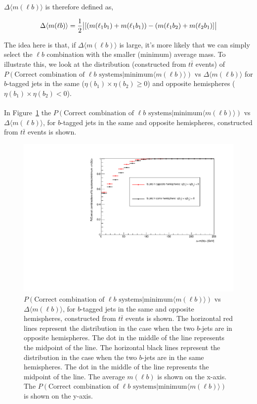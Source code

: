 $\Delta \langle m(\ell b) \rangle$ is therefore defined as,

\begin{equation}
    \Delta \langle m(\ell b) \rangle = \frac{1}{2} \abs{[( m(\ell_{1} b_{1}) + m(\ell_{1} b_{1}) ) - ( m(\ell_{1} b_{2}) + m(\ell_{2} b_{1}) ]}
\end{equation}

 The idea here is that, if $\Delta \langle m(\ell b) \rangle$ is large, it's more likely that we can simply select the $\ell b$ combination with the smaller (minimum) average mass. To illustrate this, we look at the distribution (constructed from $t\bar{t}$ events) of $P(\text{Correct combination of } \ell b \text{ systems} | \text{minimum} \langle m(\ell b) \rangle)$ vs $\Delta \langle m(\ell b) \rangle$ for $b$-tagged jets in the same ($\eta(b_{1}) \times \eta(b_{2}) \geq 0$) and opposite hemispheres ($\eta(b_{1}) \times \eta(b_{2}) < 0$).\\\\
 In Figure~\ref{fig:lb-assoc} the $P(\text{Correct combination of } \ell b \text{ systems} | \text{minimum} \langle m(\ell b) \rangle)$ vs $\Delta \langle m(\ell b) \rangle$, for $b$-tagged jets in the same and opposite hemispheres, constructed from $t\bar{t}$ events is shown.
 \begin{figure}[h!]
	\includegraphics[width=0.7\linewidth]{figures/lbassoc_2vSM.pdf}
	\centering
	\caption{$P(\text{Correct combination of } \ell b \text{ systems} | \text{minimum} \langle m(\ell b) \rangle)$ vs $\Delta \langle m(\ell b) \rangle$, for $b$-tagged jets in the same and opposite hemispheres, constructed from $t\bar{t}$ events is shown. The horizontal red lines represent the distribution in the case when the two $b$-jets are in opposite hemispheres. The dot in the middle of the line represents the midpoint of the line. The horizontal black lines represent the distribution in the case when the two $b$-jets are in the same hemispheres. The dot in the middle of the line represents the midpoint of the line. The average $m(\ell b)$ is shown on the x-axis. The $P(\text{Correct combination of } \ell b \text{ systems} | \text{minimum} \langle m(\ell b) \rangle)$ is shown on the y-axis.}
	\label{fig:lb-assoc}
\end{figure}

